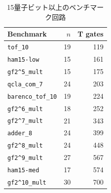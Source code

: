 \begin{table}[t]
  \centering
  \caption{15量子ビット以上のベンチマーク回路}
  \label{tab:benchmark-circuits-n15}
  \small
  \setlength{\tabcolsep}{5pt}
  \renewcommand{\arraystretch}{1.12}
  \begin{tabular}{lrr}
    \toprule
    Benchmark & $n$ & T gates \\
    \midrule
    \texttt{tof\_10}                       & 19 & 119 \\
    \texttt{ham15-low}                     & 15 & 161 \\
    \texttt{gf2\textasciicircum5\_mult}   & 15 & 175 \\
    \texttt{qcla\_com\_7}                 & 24 & 203 \\
    \texttt{barenco\_tof\_10}             & 19 & 224 \\
    \texttt{gf2\textasciicircum6\_mult}   & 18 & 252 \\
    \texttt{gf2\textasciicircum7\_mult}   & 21 & 343 \\
    \texttt{adder\_8}                      & 24 & 399 \\
    \texttt{gf2\textasciicircum8\_mult}   & 24 & 448 \\
    \texttt{gf2\textasciicircum9\_mult}   & 27 & 567 \\
    \texttt{ham15-med}                     & 17 & 574 \\
    \texttt{gf2\textasciicircum10\_mult}  & 30 & 700 \\
    \bottomrule
  \end{tabular}
\end{table}

